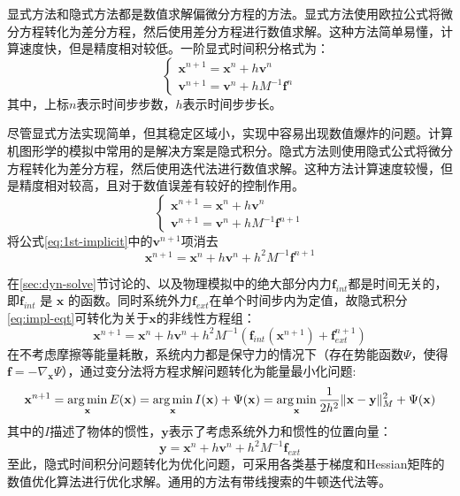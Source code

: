 显式方法和隐式方法都是数值求解偏微分方程的方法。显式方法使用欧拉公式将微分方程转化为差分方程，然后使用差分方程进行数值求解。这种方法简单易懂，计算速度快，但是精度相对较低。一阶显式时间积分格式为：
\begin{equation}
  \begin{cases}
    \mathbf x^{n+1} = \mathbf x^{n} + h\mathbf v^{n} \\
    \mathbf v^{n+1} = \mathbf v^{n} + hM^{-1} \mathbf f^{n}
  \end{cases}
\end{equation}
其中，上标$n$表示时间步步数，$h$表示时间步步长。

尽管显式方法实现简单，但其稳定区域小，实现中容易出现数值爆炸的问题。计算机图形学的模拟中常用的是解决方案是隐式积分。隐式方法则使用隐式公式将微分方程转化为差分方程，然后使用迭代法进行数值求解。这种方法计算速度较慢，但是精度相对较高，且对于数值误差有较好的控制作用。
\begin{equation}
  \label{eq:1st-implicit}
  \begin{cases}
    \mathbf x^{n+1} = \mathbf x^{n} + h\mathbf v^{n} \\
    \mathbf v^{n+1} = \mathbf v^{n} + hM^{-1} \mathbf f^{n+1}
  \end{cases}
\end{equation}
将公式\ref{eq:1st-implicit}中的$\mathbf v^{n+1}$项消去
\begin{equation}
  \label{eq:impl-eqt}
  \mathbf x^{n+1} = \mathbf x^{n}+h\mathbf v^{n} + h^{2} M^{-1}\mathbf f^{n+1}
\end{equation}

在\ref{sec:dyn-solve}节讨论的、以及物理模拟中的绝大部分内力$\mathbf f_{int}$都是时间无关的，即$\mathbf f_{int}$ 是 $\mathbf x$ 的函数。同时系统外力$\mathbf f_{ext}$在单个时间步内为定值，故隐式积分\ref{eq:impl-eqt}可转化为关于$\mathbf x$的非线性方程组：
\begin{equation}
  \mathbf x^{n+1} = \mathbf x^{n}+h\mathbf v^{n} + h^{2} M^{-1}(\mathbf f_{int}(\mathbf x^{n+1}) + \mathbf f _{ext}^{n+1})
\end{equation}
在不考虑摩擦等能量耗散，系统内力都是保守力的情况下（存在势能函数$\Psi$，使得$\mathbf f = - \nabla_{\mathbf x} \Psi$），通过变分法将方程求解问题转化为能量最小化问题:%
\begin{equation}\label{eq:impl-opt-of}
  \mathbf x^{n+1} = \mathop{\arg\min}\limits_{\mathbf x} E(\mathbf x) = \mathop{\arg\min}\limits_{\mathbf x} I(\mathbf x) + \Psi(\mathbf x) = \mathop{\arg\min}\limits_{\mathbf x} \frac{1}{2h^2} \| \mathbf x - \mathbf y\|_M^2 + \Psi(\mathbf x)
\end{equation}
其中的$I$描述了物体的惯性，$\mathbf y$表示了考虑系统外力和惯性的位置向量：
\begin{equation}
  \mathbf y = \mathbf x^{n} + h \mathbf v^{n} + h^2 M^{-1} \mathbf f_{ext}
\end{equation}
至此，隐式时间积分问题转化为优化问题，可采用各类基于梯度和Hessian矩阵的数值优化算法进行优化求解。通用的方法有带线搜索的牛顿迭代法等。

